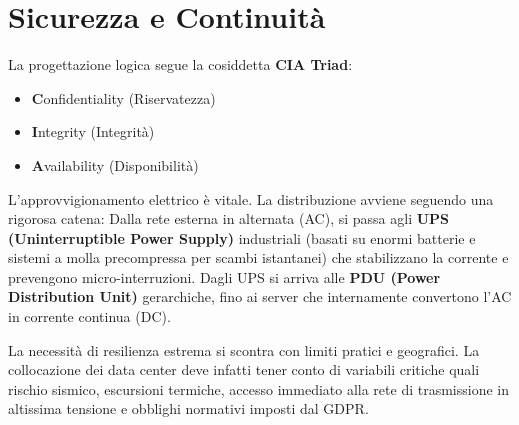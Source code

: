 \section{Sicurezza e Continuità}
La progettazione logica segue la cosiddetta \textbf{CIA Triad}:
\begin{itemize}
    \item \textbf{C}onfidentiality (Riservatezza)
    \item \textbf{I}ntegrity (Integrità)
    \item \textbf{A}vailability (Disponibilità)
\end{itemize}

L'approvvigionamento elettrico è vitale. La distribuzione avviene seguendo una rigorosa catena:
Dalla rete esterna in alternata (AC), si passa agli \textbf{UPS (Uninterruptible Power Supply)} industriali (basati su enormi batterie e sistemi a molla precompressa per scambi istantanei) che stabilizzano la corrente e prevengono micro-interruzioni. Dagli UPS si arriva alle \textbf{PDU (Power Distribution Unit)} gerarchiche, fino ai server che internamente convertono l'AC in corrente continua (DC).

La necessità di resilienza estrema si scontra con limiti pratici e geografici. La collocazione dei data center deve infatti tener conto di variabili critiche quali rischio sismico, escursioni termiche, accesso immediato alla rete di trasmissione in altissima tensione e obblighi normativi imposti dal GDPR.

